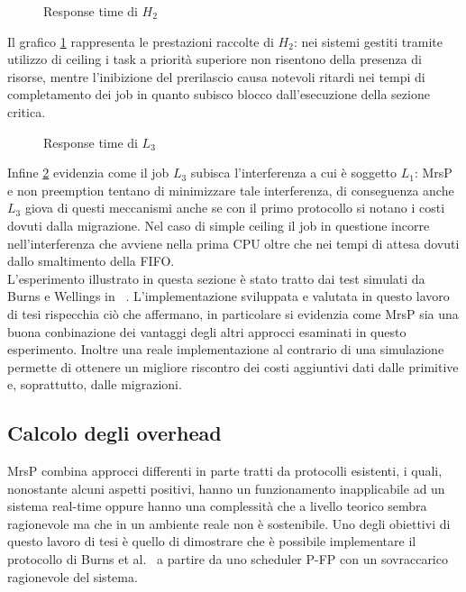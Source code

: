 \begin{figure}
  \centering
  \confrontoProtocolliHDue
  \caption{Response time di $H_2$}
  \label{fig:test_protocols_H2}
\end{figure}

\noindent Il grafico \ref{fig:test_protocols_H2} rappresenta le prestazioni raccolte di $H_2$: nei sistemi gestiti tramite utilizzo di ceiling i task a priorità superiore non risentono della presenza di risorse, mentre l'inibizione del prerilascio causa notevoli ritardi nei tempi di completamento dei job in quanto subisco blocco dall'esecuzione della sezione critica.\\

\begin{figure}
  \centering
  \confrontoProtocolliLTre
  \caption{Response time di $L_3$}
  \label{fig:test_protocols_L3}
\end{figure}

\noindent Infine \ref{fig:test_protocols_L3} evidenzia come il job $L_3$ subisca l'interferenza a cui è soggetto $L_1$: MrsP e non preemption tentano di minimizzare tale interferenza, di conseguenza anche $L_3$ giova di questi meccanismi anche se con il primo protocollo si notano i costi dovuti dalla migrazione. Nel caso di simple ceiling il job in questione incorre nell'interferenza che avviene nella prima CPU oltre che nei tempi di attesa dovuti dallo smaltimento della FIFO.\\

\noindent L'esperimento illustrato in questa sezione è stato tratto dai test simulati da Burns e Wellings in ~\cite{Burns:2013:SCM:2547348.2547350}. L'implementazione sviluppata e valutata in questo lavoro di tesi rispecchia ciò che affermano, in particolare si evidenzia come MrsP sia una buona conbinazione dei vantaggi degli altri approcci esaminati in questo esperimento. Inoltre una reale implementazione al contrario di una simulazione permette di ottenere un migliore riscontro dei costi aggiuntivi dati dalle primitive e, soprattutto, dalle migrazioni.\\

\newpage

\subsection{Calcolo degli overhead}
\label{sec:overhead}

\noindent MrsP combina approcci differenti in parte tratti da protocolli esistenti, i quali, nonostante alcuni aspetti positivi, hanno un funzionamento inapplicabile ad un sistema real-time oppure hanno una complessità che a livello teorico sembra ragionevole ma che in un ambiente reale non è sostenibile. Uno degli obiettivi di questo lavoro di tesi è quello di dimostrare che è possibile implementare il protocollo di Burns et al.~\cite{Burns:2013:SCM:2547348.2547350} a partire da uno scheduler P-FP con un sovraccarico ragionevole del sistema.

